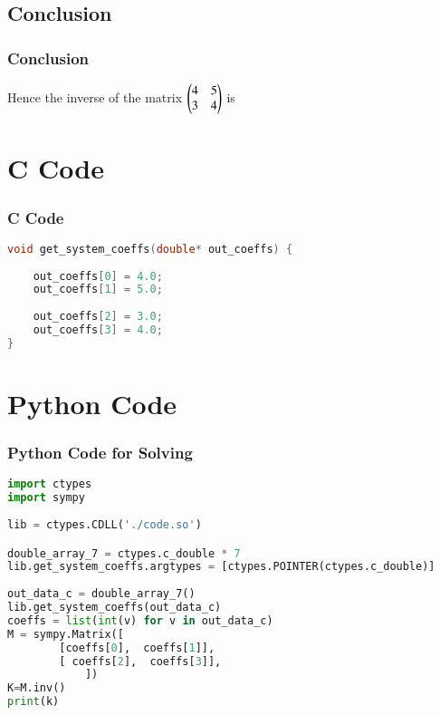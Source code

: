 \documentclass{beamer}
\numberwithin{equation}{section}
\begin{document}
\subsection{Conclusion}
\begin{frame}
\frametitle{Conclusion}
 Hence the inverse of the matrix $\begin{pmatrix}4&5\\3&4\end{pmatrix}$ is 
\end{frame}
\section{C Code}
\begin{frame}[fragile]
\frametitle{C Code}
\begin{lstlisting}[language=C]
void get_system_coeffs(double* out_coeffs) {
     
    out_coeffs[0] = 4.0;
    out_coeffs[1] = 5.0;
   
    out_coeffs[2] = 3.0;
    out_coeffs[3] = 4.0;
}
    \end{lstlisting}
\end{frame}
\section{Python Code}
\begin{frame}[fragile]
\frametitle{Python Code for Solving}
\begin{lstlisting}[language=Python]
import ctypes
import sympy
 
lib = ctypes.CDLL('./code.so')

double_array_7 = ctypes.c_double * 7
lib.get_system_coeffs.argtypes = [ctypes.POINTER(ctypes.c_double)]
    
out_data_c = double_array_7()
lib.get_system_coeffs(out_data_c)
coeffs = list(int(v) for v in out_data_c)
M = sympy.Matrix([
        [coeffs[0],  coeffs[1]],  
        [ coeffs[2],  coeffs[3]],  
            ])
K=M.inv()
print(k)
\end{lstlisting}
\end{frame}
\end{document}

